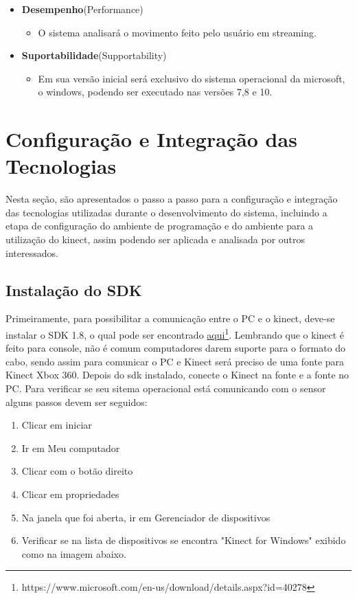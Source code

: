 \begin{itemize}
\begin{itemize}
     \end{itemize}
  \item \textbf{Desempenho}(Performance)
     \begin{itemize}
     \item O sistema analisará o movimento feito pelo usuário em streaming.
     \end{itemize}
  \item \textbf{Suportabilidade}(Supportability)
     \begin{itemize}
     \item Em sua versão inicial será exclusivo do sistema operacional da microsoft, o windows, podendo ser executado nas versões 7,8 e 10.
     \end{itemize}
   \end{itemize}



\section{Configuração e Integração das Tecnologias}
Nesta seção, são apresentados o passo a passo para a configuração e integração das tecnologias utilizadas durante o desenvolvimento do sistema,
incluindo a etapa de configuração do ambiente de programação e
do ambiente para a utilização do kinect, assim podendo ser aplicada e analisada por outros interessados.

\subsection{Instalação do SDK}
  Primeiramente, para possibilitar a comunicação entre o PC e o kinect, deve-se
instalar o SDK 1.8, o qual pode ser encontrado \href{https://www.microsoft.com/en-us/download/details.aspx?id=40278}{aqui}\footnote{https://www.microsoft.com/en-us/download/details.aspx?id=40278}.
  Lembrando que o kinect é feito para console, não é comum computadores darem suporte para o formato do
cabo, sendo assim para comunicar o PC e Kinect será preciso de uma fonte para Kinect Xbox 360.
  Depois do sdk instalado, conecte o Kinect na fonte e a fonte no PC. Para verificar se seu sitema operacional
está comunicando com o sensor alguns passos devem ser seguidos:

\begin{enumerate}
  \item Clicar em iniciar
  \item Ir em Meu computador
  \item Clicar com o botão direito
  \item Clicar em propriedades
  \item Na janela que foi aberta, ir em Gerenciador de dispositivos
  \item Verificar se na lista de dispositivos se encontra "Kinect for Windows" exibido como na imagem abaixo.
\end{enumerate}


